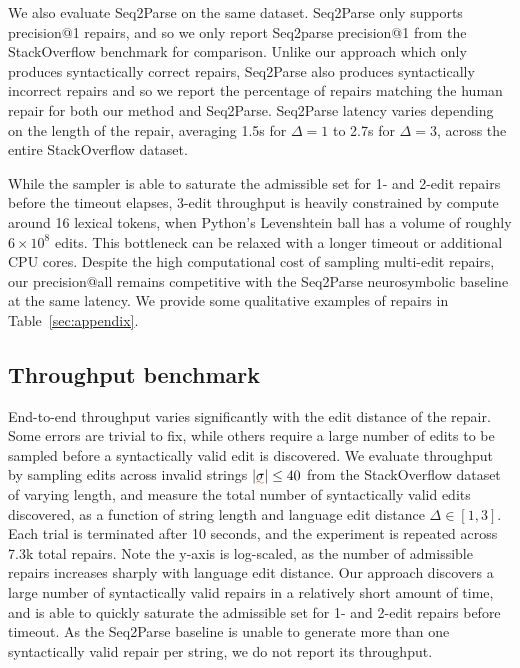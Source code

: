 \documentclass[sigplan,review,anonymous,acmsmall]{acmart}\settopmatter{printfolios=false,printccs=false,printacmref=false}
\begin{document}
We also evaluate Seq2Parse on the same dataset. Seq2Parse only supports precision@1 repairs, and so we only report Seq2parse precision@1 from the StackOverflow benchmark for comparison. Unlike our approach which only produces syntactically correct repairs, Seq2Parse also produces syntactically incorrect repairs and so we report the percentage of repairs matching the human repair for both our method and Seq2Parse. Seq2Parse latency varies depending on the length of the repair, averaging 1.5s for $\Delta=1$ to 2.7s for $\Delta=3$, across the entire StackOverflow dataset.

While the sampler is able to saturate the admissible set for 1- and 2-edit repairs before the timeout elapses, 3-edit throughput is heavily constrained by compute around 16 lexical tokens, when Python's Levenshtein ball has a volume of roughly $6\times 10^8$ edits. This bottleneck can be relaxed with a longer timeout or additional CPU cores. Despite the high computational cost of sampling multi-edit repairs, our precision@all remains competitive with the Seq2Parse neurosymbolic baseline at the same latency. We provide some qualitative examples of repairs in Table~\ref{sec:appendix}.

\subsection{Throughput benchmark}

\begin{figure}
  \vspace{-15pt}
  \resizebox{.3\textwidth}{!}{}
  \label{fig:throughput}
\end{figure}

End-to-end throughput varies significantly with the edit distance of the repair. Some errors are trivial to fix, while others require a large number of edits to be sampled before a syntactically valid edit is discovered. We evaluate throughput by sampling edits across invalid strings $|\err\sigma| \leq 40$ from the StackOverflow dataset of varying length, and measure the total number of syntactically valid edits discovered, as a function of string length and language edit distance $\Delta\in[1, 3]$. Each trial is terminated after 10 seconds, and the experiment is repeated across 7.3k total repairs. Note the y-axis is log-scaled, as the number of admissible repairs increases sharply with language edit distance. Our approach discovers a large number of syntactically valid repairs in a relatively short amount of time, and is able to quickly saturate the admissible set for 1- and 2-edit repairs before timeout. As the Seq2Parse baseline is unable to generate more than one syntactically valid repair per string, we do not report its throughput.
\end{document}

